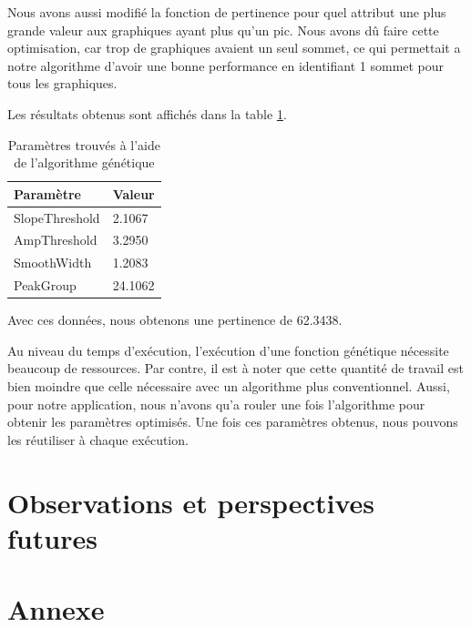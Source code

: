 \documentclass[12pt,letterpaper]{article}
\begin{document}
Nous avons aussi modifié la fonction de pertinence pour quel attribut une plus grande valeur aux graphiques ayant plus qu’un pic.
Nous avons dû faire cette optimisation, car trop de graphiques avaient un seul sommet, ce qui permettait a notre algorithme d'avoir une bonne
performance en identifiant 1 sommet pour tous les graphiques.

Les résultats obtenus sont affichés dans la table \ref{tab:genparam}.

\begin{table}[h]
  \begin{center}
    \begin{tabular} {|l|l|}
        \hline
        \bf{Paramètre} & \bf{Valeur} \\
        \hline
        SlopeThreshold & 2.1067 \\
        \hline
        AmpThreshold & 3.2950 \\
        \hline
        SmoothWidth & 1.2083 \\
        \hline
        PeakGroup & 24.1062 \\
        \hline
    \end{tabular}
    \caption{Paramètres trouvés à l'aide de l'algorithme génétique}
    \label{tab:genparam}
  \end{center}
\end{table}

Avec ces données, nous obtenons une pertinence de 62.3438.

Au niveau du temps d'exécution, l'exécution d'une fonction génétique nécessite beaucoup de ressources. Par contre, il est à noter que
cette quantité de travail est bien moindre que celle nécessaire avec un algorithme plus conventionnel. Aussi, pour notre application, nous n'avons
qu'a rouler une fois l'algorithme pour obtenir les paramètres optimisés. Une fois ces paramètres obtenus, nous pouvons les réutiliser à chaque exécution.

\section{Observations et perspectives futures}

\pagebreak
\section{Annexe}
\end{document}
